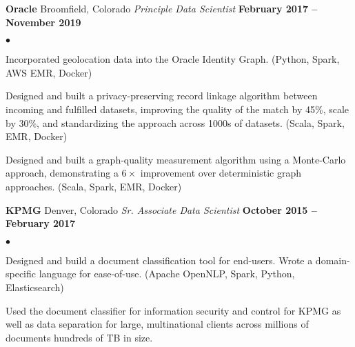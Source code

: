 \documentclass[margin,line, 11pt]{res}
\newenvironment{list2}{
  \begin{list}{$\bullet$}{%
      \setlength{\itemsep}{0in}
      \setlength{\parsep}{0in} \setlength{\parskip}{0in}
      \setlength{\topsep}{0in} \setlength{\partopsep}{0in}
      \setlength{\leftmargin}{0.2in}}}{\end{list}}
\begin{document}
\begin{resume}
\textbf{Oracle} \hfill Broomfield, Colorado\newline
\textit{Principle Data Scientist} \hfill \textbf{February 2017 -- November 2019}\newline
    \begin{list2}
    	\vspace*{-5mm}
      \item Incorporated geolocation data into the Oracle Identity Graph. (Python, Spark, AWS EMR, Docker)
    	\item Designed and built a privacy-preserving record linkage algorithm between incoming and fulfilled datasets, improving the quality of the match by 45\%, scale by 30\%, and standardizing the approach across 1000s of datasets. (Scala, Spark, EMR, Docker)
    	\item Designed and built a graph-quality measurement algorithm using a Monte-Carlo approach, demonstrating a $6\times$ improvement over deterministic graph approaches. (Scala, Spark, EMR, Docker)
    \end{list2}
\vspace*{-2mm}

\textbf{KPMG} \hfill Denver, Colorado\newline
\textit{Sr. Associate Data Scientist} \hfill \textbf{October 2015 -- February 2017}\newline
    \begin{list2}
    	\vspace*{-5mm}
      \item Designed and build a document classification tool for end-users. Wrote a domain-specific language for ease-of-use. (Apache OpenNLP, Spark, Python, Elasticsearch)
      \item Used the document classifier for information security and control for KPMG as well as data separation for large, multinational clients across millions of documents hundreds of TB in size.
    \end{list2}
\vspace*{-2mm}



\end{resume}
\end{document}
